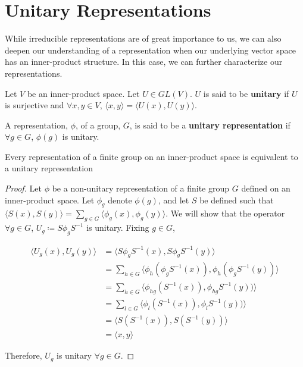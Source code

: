 \section{Unitary Representations}

While irreducible representations are of great importance to us, we can also deepen our understanding of a representation when our underlying vector space has an inner-product structure. In this case, we can further characterize our representations. 

\begin{definition}
	Let $V$ be an inner-product space. Let $U \in GL(V)$. $U$ is said to be \textbf{unitary} if $U$ is surjective and $\forall x,y \in V$, $\langle x , y \rangle = \langle U(x) , U(y) \rangle$.
\end{definition}

\begin{definition}
	A representation, $\phi$, of a group, $G$, is said to be a \textbf{unitary representation} if $\forall g\in G$, $\phi(g)$ is unitary.
\end{definition}

\begin{theorem}
	Every representation of a finite group on an inner-product space is equivalent to a unitary representation
\end{theorem}

\begin{proof} Let $\phi$ be a non-unitary representation of a finite group $G$ defined on an inner-product space. Let $\phi_g$ denote $\phi(g)$, and let $S$ be defined such that $\langle S(x) , S(y) \rangle = \sum_{g \in G} \langle \phi_g (x) , \phi_g (y) \rangle$. We will show that the operator $\forall g \in G$, $U_g \coloneq S\phi_gS^{-1}$ is unitary. Fixing $g\in G$,


\begin{equation}
	\begin{aligned}
		\langle U_g(x) , U_g(y) \rangle &= \langle S\phi_gS^{-1}(x) , S\phi_gS^{-1}(y)\rangle \\
									&= \sum_{h \in G} \langle \phi_h(\phi_gS^{-1}(x)) , \phi_h(\phi_gS^{-1}(y))\rangle \\
									&= \sum_{h\in G} \langle \phi_{hg}(S^{-1}(x)) , \phi_{hg}S^{-1}(y))\rangle \\
									&= \sum_{l\in G} \langle \phi_{l}(S^{-1}(x)) , \phi_{l}S^{-1}(y))\rangle \\
									&= \langle S(S^{-1}(x)) , S(S^{-1}(y))\rangle \\
									&= \langle x , y \rangle 
	\end{aligned}
\end{equation}

Therefore, $U_g$ is unitary $\forall g \in G$. \end{proof}

